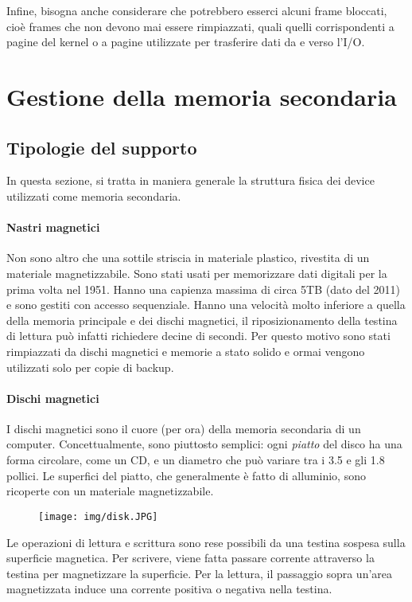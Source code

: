 \documentclass[a4paper]{article}
\begin{document}
Infine, bisogna anche considerare che potrebbero esserci alcuni frame bloccati, cioè frames che non devono mai essere rimpiazzati, quali quelli corrispondenti a pagine del kernel o a pagine utilizzate per trasferire dati da e verso l'I/O.


\section{Gestione della memoria secondaria}

\subsection{Tipologie del supporto}
In questa sezione, si tratta in maniera generale la struttura fisica dei device utilizzati come memoria secondaria.

\paragraph{Nastri magnetici}
Non sono altro che una sottile striscia in materiale plastico, rivestita di un materiale magnetizzabile. Sono stati usati per memorizzare dati digitali per la prima volta nel 1951. Hanno una capienza massima di circa 5TB (dato del 2011) e sono gestiti con accesso sequenziale. Hanno una velocità molto inferiore a quella della memoria principale e dei dischi magnetici, il riposizionamento della testina di lettura può infatti richiedere decine di secondi. Per questo motivo sono stati rimpiazzati da dischi magnetici e memorie a stato solido e ormai vengono utilizzati solo per copie di backup.

\paragraph{Dischi magnetici}
I dischi magnetici sono il cuore (per ora) della memoria secondaria di un computer. Concettualmente, sono piuttosto semplici: ogni \textit{piatto} del disco ha una forma circolare, come un CD, e un diametro che può variare tra i 3.5 e gli 1.8 pollici. Le superfici del piatto, che generalmente è fatto di alluminio, sono ricoperte con un materiale magnetizzabile.

\begin{figure}[h!]
    \centering
    \texttt{[image: img/disk.JPG]}
\end{figure}

Le operazioni di lettura e scrittura sono rese possibili da una testina sospesa sulla superficie magnetica. Per scrivere, viene fatta passare corrente attraverso la testina per magnetizzare la superficie. Per la lettura, il passaggio sopra un'area magnetizzata induce una corrente positiva o negativa nella testina.
\end{document}
